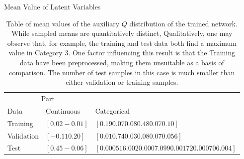 \documentclass{article}
\begin{document}
\begin{table}[t]
  \caption{Mean Value of Latent Variables}
  \label{sample-table}
  \centering
  \begin{tabular}{lll}
    \toprule
    \multicolumn{2}{c}{Part}                   \\
    \cmidrule{1-2}
    Data       & Continuous      & Categorical \\
    \midrule
    Training   & $[ 0.02 -0.01]$ &$[ 0.19  0.07  0.08  0.48  0.07  0.10 ]$ \\
    Validation & $[-0.11  0.20]$ & $[ 0.01  0.74  0.03  0.08  0.07  0.056]$     \\
    Test       & $[ 0.45 -0.06]$       & $[  0.000516   .002   0.0007   .099 0.00172   0.000706 .004]$  \\
    \bottomrule
  \end{tabular}
  \caption{Table of mean values of the auxiliary $Q$ distribution of the trained network.  While sampled means are quantitatively distinct, Qualitatively, one may observe that, for example, the training and test data both find a maximum value in Category 3.  One factor influencing this result is that the Training data have been preprocessed, making them unsuitable as a basis of comparison.  The number of test samples in this case is much smaller than either validation or training samples. }
\end{table}

\end{document}
